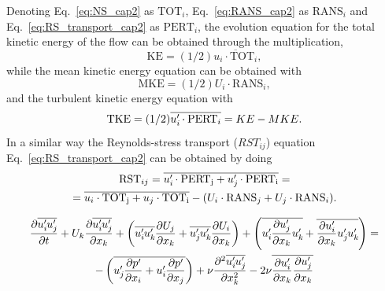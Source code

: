 Denoting Eq.~\ref{eq:NS_cap2} as $\mathrm{TOT}_i$, Eq.~\ref{eq:RANS_cap2} as $\mathrm{RANS}_i$ and Eq.~\ref{eq:RS_transport_cap2} as $\mathrm{PERT}_i$, the evolution equation for the total kinetic energy of the flow can be obtained through the multiplication,
\begin{equation}
    \mathrm{KE} = (1/2) \overline{u_i \cdot \mathrm{TOT}_i}, 
\end{equation}
while the mean kinetic energy equation can be obtained with 
\begin{equation}
    \mathrm{MKE} = (1/2) U_i \cdot \mathrm{RANS}_i,
\end{equation}
and the turbulent kinetic energy equation with 
\begin{equation}
    \mathrm{TKE} = (1/2) \overline{u_i^{\prime}\mkern-1.2mu \cdot \mathrm{PERT}_i} = KE - MKE.
\end{equation}
In a similar way the Reynolds-stress transport ($RST_{ij}$) equation Eq.~\ref{eq:RS_transport_cap2} can be obtained by doing 
\begin{multline}
    \mathrm{RST}_{ij} = \overline{u_i^{\prime}\mkern-1.2mu \cdot \mathrm{PERT_j} + u_j^{\prime}\mkern-1.2mu \cdot \mathrm{PERT_i}} = \\
    = \overline{u_i \cdot \mathrm{TOT_j} + u_j \cdot \mathrm{TOT_i}} - (U_i \cdot \mathrm{RANS}_j + U_j \cdot \mathrm{RANS}_i ) .
\end{multline}

\begin{multline}
    \label{eq:RS_transport_cap2}
    \pdv{\overline{u_i^{\prime}\mkern-1.2muu_j^{\prime}\mkern-1.2mu}}{t} + 
    U_k\pdv{\overline{u_i^{\prime}\mkern-1.2muu_j^{\prime}\mkern-1.2mu}}{x_k} + 
    \left(
    \overline{u_i^{\prime}\mkern-1.2mu u_k^{\prime}\mkern-1.2mu}\pdv{U_j}{x_k} + \overline{u_j^{\prime}\mkern-1.2mu u_k^{\prime}\mkern-1.2mu}\pdv{U_i}{x_k}
    \right) +
    \left(
    \overline{u_i^{\prime}\mkern-1.2mu \pdv{u_j^{\prime}\mkern-1.2mu}{x_k} u_k^{\prime}\mkern-1.2mu} + \overline{\pdv{u_i^{\prime}\mkern-1.2mu}{x_k} u_j^{\prime}\mkern-1.2mu u_k^{\prime}\mkern-1.2mu}
    \right)
    = \\ 
    - \left( \overline{
    u_j^{\prime}\mkern-1.2mu \pdv{p^{\prime}\mkern-1.2mu}{x_i} + u_i^{\prime}\mkern-1.2mu \pdv{p^{\prime}\mkern-1.2mu}{x_j}
    } \right) 
    + \nu \frac{\partial^2 \overline{u_i^{\prime}\mkern-1.2mu u_j^{\prime}\mkern-1.2mu}}{\partial x_k^2} 
    - 2\nu \overline{\pdv{u_i^{\prime}\mkern-1.2mu}{x_k} \pdv{u_j^{\prime}\mkern-1.2mu}{x_k}}
\end{multline}


